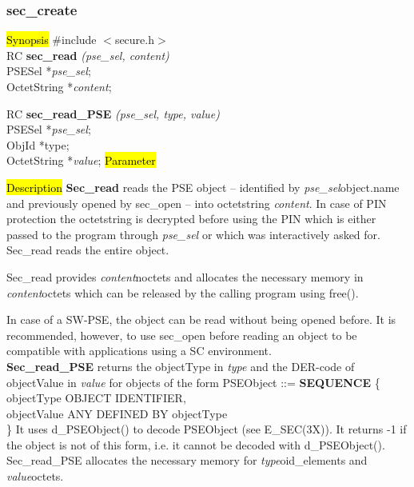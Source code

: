 \subsubsection{sec\_create}
\label{sec_read}
\hl{Synopsis}
\#include $<$secure.h$>$ \\ [0.5cm]
RC {\bf sec\_read} {\em (pse\_sel, content)} \\
PSESel *{\em pse\_sel}; \\
OctetString *{\em content}; 

RC {\bf sec\_read\_PSE} {\em (pse\_sel, type, value)} \\
PSESel *{\em pse\_sel}; \\
ObjId *type; \\
OctetString *{\em value};
\hl{Parameter}




\hl{Description}
{\bf Sec\_read} reads the PSE object -- identified by {\em pse\_sel}\pf object.name 
and previously opened by sec\_open -- into octetstring {\em content}.
In case of PIN protection the octetstring is
decrypted before using the PIN which is either passed to the program through {\em pse\_sel}
or which was interactively asked for. Sec\_read reads the entire object. 

Sec\_read provides {\em content}\pf noctets and allocates the necessary memory
in {\em content}\pf octets which can be released by the calling program using free(). 

In case of a SW-PSE, the object can be read without being opened before. It is recommended, however,
to use sec\_open before reading an object to be compatible with applications using
a SC environment. \\ [1em]
{\bf Sec\_read\_PSE} returns the objectType in {\em type} and the DER-code of objectValue
in {\em value} for objects of the form
\bc
{\small
\bvtab
PSEObject ::= \3 {\bf SEQUENCE} \{ \\
\5 objectType \3 OBJECT IDENTIFIER, \\
\5 objectValue \3 ANY DEFINED BY objectType \\
\3 \}
\evtab
}
\ec
It uses d\_PSEObject() to decode PSEObject (see E\_SEC(3X)).
It returns -1 if the object is not of this form, i.e. it cannot be decoded with d\_PSEObject().
Sec\_read\_PSE allocates the necessary memory for {\em type}\pf oid\_elements and {\em value}\pf octets.

